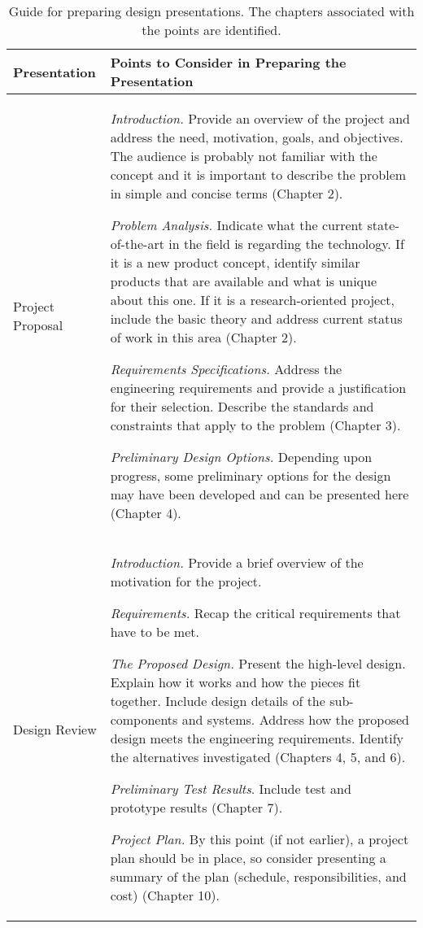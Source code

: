 \begin{table}
\caption{Guide for preparing design presentations. The chapters
associated with the points are identified.}
\label{table:preparingPresentation}
\begin{tabular}{|m{2cm}|m{13cm}|}
\hline
\textbf{Presentation} & 
\textbf{Points to Consider in Preparing the Presentation} \\ \hline

Project Proposal & \emph{Introduction.} Provide an overview of the
project and address the need, motivation, goals, and objectives. The
audience is probably not familiar with the concept and it is important
to describe the problem in simple and concise terms (Chapter 2).

\emph{Problem Analysis.} Indicate what the current state-of-the-art in
the field is regarding the technology. If it is a new product concept,
identify similar products that are available and what is unique about
this one. If it is a research-oriented project, include the basic theory
and address current status of work in this area (Chapter 2).

\emph{Requirements Specifications.} Address the engineering requirements
and provide a justification for their selection. Describe the standards
and constraints that apply to the problem (Chapter 3).

\emph{Preliminary Design Options.} Depending upon progress, some
preliminary options for the design may have been developed and can be
presented here (Chapter 4). \\ \hline

Design Review & \emph{Introduction.} Provide a brief overview of the
motivation for the project.

\emph{Requirements.} Recap the critical requirements that have to be
met.

\emph{The Proposed Design.} Present the high-level design. Explain how
it works and how the pieces fit together. Include design details of the
sub-components and systems. Address how the proposed design meets the
engineering requirements. Identify the alternatives investigated
(Chapters 4, 5, and 6).

\emph{Preliminary Test Results}. Include test and prototype results
(Chapter 7).

\emph{Project Plan.} By this point (if not earlier), a project plan
should be in place, so consider presenting a summary of the plan
(schedule, responsibilities, and cost) (Chapter 10). \\ \hline


\end{tabular}
\end{table}
